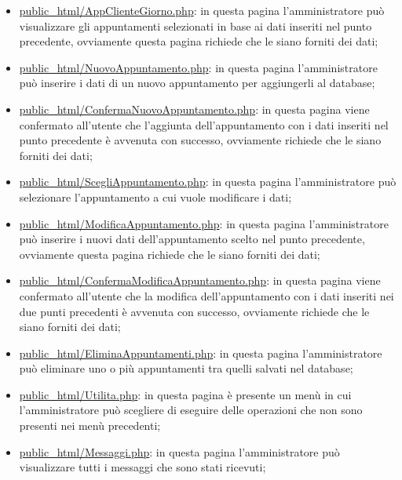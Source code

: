 {\begin{itemize}
		\item \underline{public\_html/AppClienteGiorno.php}: in questa pagina l'amministratore può visualizzare gli appuntamenti selezionati in base ai dati inseriti nel punto precedente, ovviamente questa pagina richiede che le siano forniti dei dati;
		\item \href{http://tecnologie-web.studenti.math.unipd.it/tecweb/~pgabelli/public\_html/NuovoAppuntamento.php}{public\_html/NuovoAppuntamento.php}: in questa pagina l'amministratore può inserire i dati di un nuovo appuntamento per aggiungerli al database;
		\item \underline{public\_html/ConfermaNuovoAppuntamento.php}: in questa pagina viene confermato all'utente che l'aggiunta dell'appuntamento con i dati inseriti nel punto precedente è avvenuta con successo, ovviamente richiede che le siano forniti dei dati;
		\item \href{http://tecnologie-web.studenti.math.unipd.it/tecweb/~pgabelli/public\_html/ScegliAppuntamento.php}{public\_html/ScegliAppuntamento.php}: in questa pagina l'amministratore può selezionare l'appuntamento a cui vuole modificare i dati;
		\item \underline{public\_html/ModificaAppuntamento.php}: in questa pagina l'amministratore può inserire i nuovi dati dell'appuntamento scelto nel punto precedente, ovviamente questa pagina richiede che le siano forniti dei dati;
		\item \underline{public\_html/ConfermaModificaAppuntamento.php}: in questa pagina viene confermato all'utente che la modifica dell'appuntamento con i dati inseriti nei due punti precedenti è avvenuta con successo, ovviamente richiede che le siano forniti dei dati;
		\item \href{http://tecnologie-web.studenti.math.unipd.it/tecweb/~pgabelli/public\_html/EliminaAppuntamenti.php}{public\_html/EliminaAppuntamenti.php}: in questa pagina l'amministratore può eliminare uno o più appuntamenti tra quelli salvati nel database;
		\item \href{http://tecnologie-web.studenti.math.unipd.it/tecweb/~pgabelli/public\_html/Utilita.php}{public\_html/Utilita.php}: in questa pagina è presente un menù in cui l'amministratore può scegliere di eseguire delle operazioni che non sono presenti nei menù precedenti;
		\item \href{http://tecnologie-web.studenti.math.unipd.it/tecweb/~pgabelli/public\_html/Messaggi.php}{public\_html/Messaggi.php}: in questa pagina l'amministratore può visualizzare tutti i messaggi che sono stati ricevuti;

\end{itemize}}
